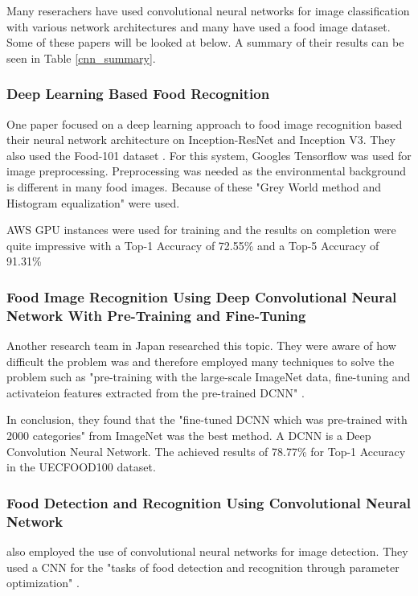 Many reserachers have used convolutional neural networks for image
classification with various network architectures and many have used a food image dataset.
Some of these papers will be looked at below.
A summary of their results can be seen in Table \ref{cnn_summary}.

\subsubsection*{Deep Learning Based Food Recognition}
One paper focused on a deep learning approach to food image recognition based
their neural network architecture on Inception-ResNet and Inception V3. They
also used the Food-101 dataset \textcite{deepLearning}. For this system, Googles
Tensorflow was used for image preprocessing. Preprocessing was needed as the
environmental background is different in many food images. Because of these
"Grey World method and Histogram equalization" \textcite{deepLearning} were
used.

AWS GPU instances were used for training and the results on completion were
quite impressive with a Top-1 Accuracy of 72.55\% and a Top-5 Accuracy of
91.31\% \textcite{deepLearning}

\subsubsection*{Food Image Recognition Using Deep Convolutional Neural Network
With Pre-Training and Fine-Tuning}
Another research team in Japan researched this topic. They were aware of how
difficult the problem was and therefore employed many techniques to solve the
problem such as "pre-training with the large-scale ImageNet data, fine-tuning
and activateion features extracted from the pre-trained DCNN"
\textcite{yanaiFood}. 

In conclusion, they found that the "fine-tuned DCNN which was pre-trained
with 2000 categories" \textcite{yanaiFood} from ImageNet was the best method. A
DCNN is a Deep Convolution Neural Network. The achieved results of 78.77\% for
Top-1 Accuracy in the UECFOOD100 dataset.

\subsubsection*{Food Detection and Recognition Using Convolutional Neural Network}
\textcite{kagayaFood} also employed the use of convolutional neural networks for
image detection. They used a CNN for the "tasks of food detection and recognition
through parameter optimization" \textcite{kagayaFood}.

